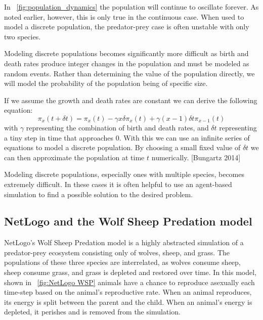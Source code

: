         In ~\ref{fig:population_dynamics} the population will continue to oscillate forever.
        As noted earlier, however, this is only true in the continuous case.
        When used to model a discrete population, the predator-prey case is often
        unstable with only two species.

        Modeling discrete populations becomes significantly more difficult as birth
        and death rates produce integer changes in the population and must be modeled
        as random events.
        Rather than determining the value of the population directly, we will model
        the probability of the population being of specific size.

        If we assume the growth and death rates are constant we can derive the
        following equation:
        \begin{equation}\label{eq:discrete_population}
            \pi_x(t + \delta t) =
            \pi_x(t) - \gamma x \delta \pi_x(t) + \gamma(x - 1)\delta t \pi_{x - 1}(t)
        \end{equation}
        with $\gamma$ representing the combination of birth and death rates,
        and $\delta t$ representing a tiny step in time that approaches $0$.
        With this we can use an infinite series of equations to model a
        discrete population.
        By choosing a small fixed value of $\delta t$ we can then approximate
        the population at time $t$ numerically. [Bungartz 2014]

        Modeling discrete populations, especially ones with multiple species,
        becomes extremely difficult.
        In these cases it is often helpful to use an agent-based simulation
        to find a possible solution to the desired problem.

    \subsection{NetLogo and the Wolf Sheep Predation model}\label{subsec:netlogo-wsp}
        NetLogo's Wolf Sheep Predation model is a highly abstracted simulation of a
        predator-prey ecosystem consisting only of wolves, sheep, and grass.
        The populations of these three species are interrelated, as wolves consume sheep,
        sheep consume grass, and grass is depleted and restored over time.
        In this model, shown in ~\ref{fig:NetLogo WSP} animals have a chance to reproduce asexually each time-step based
        on the animal's reproductive rate.
        When an animal reproduces, its energy is split between the parent and the child.
        When an animal's energy is depleted, it perishes and is removed from the simulation.

